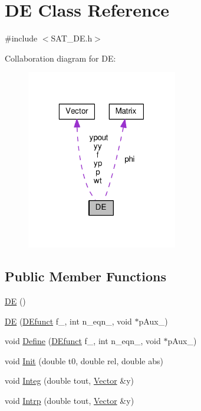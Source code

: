 \hypertarget{classDE}{\section{D\-E Class Reference}
\label{classDE}
}


{\ttfamily \#include $<$S\-A\-T\-\_\-\-D\-E.\-h$>$}



Collaboration diagram for D\-E\-:\nopagebreak
\begin{figure}[H]
\begin{center}
\leavevmode
\includegraphics[width=187pt]{classDE__coll__graph}
\end{center}
\end{figure}
\subsection*{Public Member Functions}
\begin{DoxyCompactItemize}
\item 
\hyperlink{classDE_a37d9ef0ccffda10dda67b29538416d0c}{D\-E} ()
\item 
\hyperlink{classDE_a6b0641c47ad6a3d42f04d08583e6839d}{D\-E} (\hyperlink{SAT__DE_8h_a37c3f0fc3c33a5b858a3f1c90353da48}{D\-Efunct} f\-\_\-, int n\-\_\-eqn\-\_\-, void $\ast$p\-Aux\-\_\-)
\item 
void \hyperlink{classDE_a1eebc6bc641f0f375e6077f0404fc1e0}{Define} (\hyperlink{SAT__DE_8h_a37c3f0fc3c33a5b858a3f1c90353da48}{D\-Efunct} f\-\_\-, int n\-\_\-eqn\-\_\-, void $\ast$p\-Aux\-\_\-)
\item 
void \hyperlink{classDE_a2cedbf51ef4121e63b3c4578df6b3905}{Init} (double t0, double rel, double abs)
\item 
void \hyperlink{classDE_a6a008818dc6d8ad8defd822091207093}{Integ} (double tout, \hyperlink{classVector}{Vector} \&y)
\item 
void \hyperlink{classDE_ada59157cf555a77f65242c04ad1c9e19}{Intrp} (double tout, \hyperlink{classVector}{Vector} \&y)
\end{DoxyCompactItemize}
